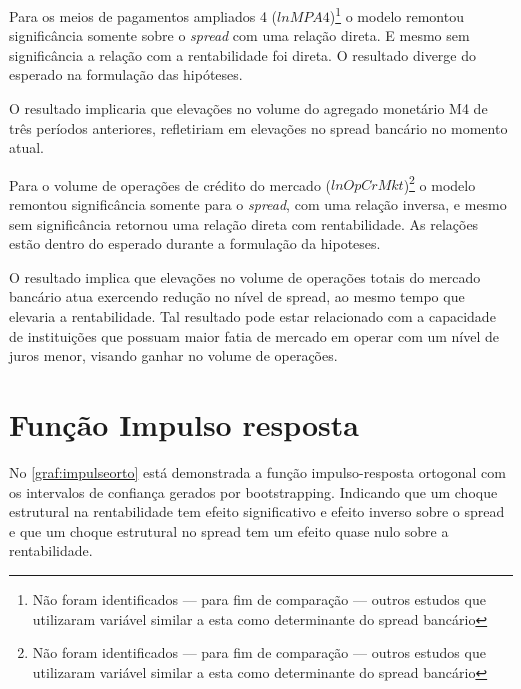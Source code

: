 \documentclass[
  12pt,
  12pt,
  openright,
  oneside,
  a4paper,
  chapter=TITLE,
  section=TITLE,
  subsection=TITLE,
  subsubsection=TITLE,
  english,
  portugues,
  sumario=tradicional]{abntex2}
\begin{document}
Para os meios de pagamentos ampliados 4 (\(lnMPA4\))\footnote{Não foram identificados — para fim de comparação — outros estudos que utilizaram variável similar a esta como determinante do spread bancário} o modelo remontou significância somente sobre o \emph{spread} com uma relação direta. E mesmo sem significância a relação com a rentabilidade foi direta. O resultado diverge do esperado na formulação das hipóteses.

O resultado implicaria que elevações no volume do agregado monetário M4 de três períodos anteriores, refletiriam em elevações no spread bancário no momento atual.

Para o volume de operações de crédito do mercado (\(lnOpCrMkt\))\footnote{Não foram identificados — para fim de comparação — outros estudos que utilizaram variável similar a esta como determinante do spread bancário} o modelo remontou significância somente para o \emph{spread}, com uma relação inversa, e mesmo sem significância retornou uma relação direta com rentabilidade. As relações estão dentro do esperado durante a formulação da hipoteses.

O resultado implica que elevações no volume de operações totais do mercado bancário atua exercendo redução no nível de spread, ao mesmo tempo que elevaria a rentabilidade. Tal resultado pode estar relacionado com a capacidade de instituições que possuam maior fatia de mercado em operar com um nível de juros menor, visando ganhar no volume de operações.

\section{Função Impulso resposta}

No \autoref{graf:impulseorto} está demonstrada a função impulso-resposta ortogonal com os intervalos de confiança gerados por bootstrapping. Indicando que um choque estrutural na rentabilidade tem efeito significativo e efeito inverso sobre o spread e que um choque estrutural no spread tem um efeito quase nulo sobre a rentabilidade.

\vspace{20pt}
\end{document}
